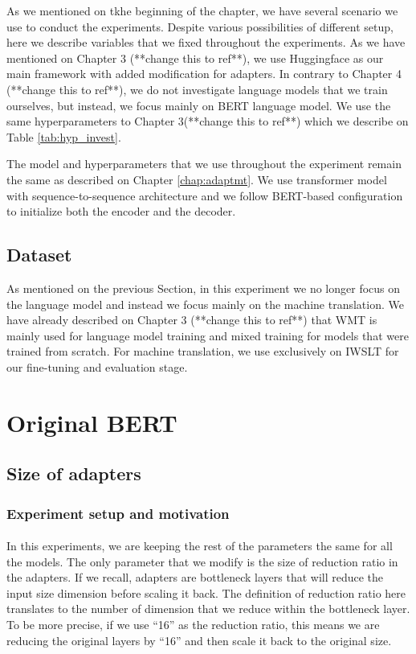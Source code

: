 As we mentioned on tkhe beginning of the chapter, we have several scenario we use to conduct the experiments. Despite various possibilities of different setup, here we describe variables that we fixed throughout the experiments. As we have mentioned on Chapter 3 (**change this to ref**), we use Huggingface as our main framework with added modification for adapters. In contrary to Chapter 4 (**change this to ref**), we do not investigate language models that we train ourselves, but instead, we focus mainly on BERT language model. We use the same hyperparameters to Chapter 3(**change this to ref**) which we describe on Table \ref{tab:hyp_invest}.

The model and hyperparameters that we use throughout the experiment remain the same as described on Chapter \ref{chap:adaptmt}. We use transformer model with sequence-to-sequence architecture and we follow BERT-based configuration to initialize both the encoder and the decoder.


\subsection{Dataset}
As mentioned on the previous Section, in this experiment we no longer focus on the language model and instead we focus mainly on the machine translation. We have already described on Chapter 3 (**change this to ref**) that WMT is mainly used for language model training and mixed training for models that were trained from scratch. For machine translation, we use exclusively on IWSLT for our fine-tuning and evaluation stage.


\section{Original BERT}
\subsection{Size of adapters}
\subsubsection{Experiment setup and motivation}
\paragraph{}
In this experiments, we are keeping the rest of the parameters the same for all the models. The only parameter that we modify is the size of reduction ratio in the adapters. If we recall, adapters are bottleneck layers that will reduce the input size dimension before scaling it back. The definition of reduction ratio here translates to the number of dimension that we reduce within the bottleneck layer. To be more precise, if we use ``16'' as the reduction ratio, this means we are reducing the original layers by ``16'' and then scale it back to the original size.

